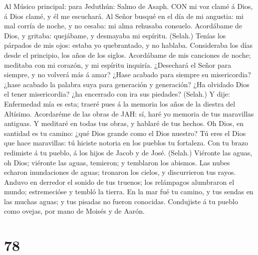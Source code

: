  Al Músico principal: para Jeduthún: Salmo de Asaph. CON mi
voz clamé á Dios, á Dios clamé, y él me escuchará.  Al Señor
busqué en el día de mi angustia: mi mal corría de noche, y no cesaba: mi
alma rehusaba consuelo.  Acordábame de Dios, y gritaba:
quejábame, y desmayaba mi espíritu. (Selah.)  Tenías los
párpados de mis ojos: estaba yo quebrantado, y no hablaba. 
Consideraba los días desde el principio, los años de los siglos.
 Acordábame de mis canciones de noche; meditaba con mi
corazón, y mi espíritu inquiría.  ¿Desechará el Señor para
siempre, y no volverá más á amar?  ¿Hase acabado para
siempre su misericordia? ¿hase acabado la palabra suya para generación y
generación?  ¿Ha olvidado Dios el tener misericordia? ¿ha
encerrado con ira sus piedades? (Selah.)  Y dije:
Enfermedad mía es esta; traeré pues á la memoria los años de la diestra
del Altísimo.  Acordaréme de las obras de JAH: sí, haré yo
memoria de tus maravillas antiguas.  Y meditaré en todas
tus obras, y hablaré de tus hechos.  Oh Dios, en santidad
es tu camino: ¿qué Dios grande como el Dios nuestro?  Tú
eres el Dios que hace maravillas: tú hiciste notoria en los pueblos tu
fortaleza.  Con tu brazo redimiste á tu pueblo, á los hijos
de Jacob y de José. (Selah.)  Viéronte las aguas, oh Dios;
viéronte las aguas, temieron; y temblaron los abismos.  Las
nubes echaron inundaciones de aguas; tronaron los cielos, y discurrieron
tus rayos.  Anduvo en derredor el sonido de tus truenos;
los relámpagos alumbraron el mundo; estremecióse y tembló la tierra.
 En la mar fué tu camino, y tus sendas en las muchas aguas;
y tus pisadas no fueron conocidas.  Condujiste á tu pueblo
como ovejas, por mano de Moisés y de Aarón.

\hypertarget{section-77}{%
\section{78}\label{section-77}}

